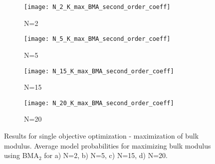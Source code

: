 \documentclass[preprint,amsmath,amssymb,aps, prb,showkeys]{revtex4-1}
\begin{document}
\begin{figure}[htp]
        \parbox{.975\textwidth}{
            \begin{subfigure}{.475\linewidth}
                \texttt{[image: N\_2\_K\_max\_BMA\_second\_order\_coeff]}
                \caption{N=2}
                \label{fig:K_max_so_coeff_N_2_BMA}
        \end{subfigure}
            \begin{subfigure}{.475\linewidth}
                \texttt{[image: N\_5\_K\_max\_BMA\_second\_order\_coeff]}
                \caption{N=5}
                \label{fig:K_max_so_coeff_N_5_BMA}
        \end{subfigure}
            \begin{subfigure}{.475\linewidth}
                \texttt{[image: N\_15\_K\_max\_BMA\_second\_order\_coeff]}
                \caption{N=15}
                \label{fig:K_max_so_coeff_N_15_BMA}
        \end{subfigure}
            \begin{subfigure}{.475\linewidth}
                \texttt{[image: N\_20\_K\_max\_BMA\_second\_order\_coeff]}
                \caption{N=20}
                \label{fig:K_max_so_coeff_N_20_BMA}
        \end{subfigure}
        }
        \caption{ Results for single objective optimization - maximization of bulk modulus. Average model probabilities for maximizing bulk modulus using BMA$_2$ for a) N=2, b) N=5, c) N=15, d) N=20.}
        \label{fig:K_max_so_coeff_BMA}
    
\end{figure} 
\end{document}
